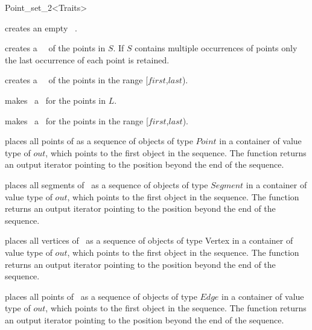 \begin{ccRefClass}{Point_set_2<Traits>}
\ccHtmlLinksOn


\ccCreation

{creates an empty \ccRefName\ .}

{creates a \ccRefName\ \ccVar\ of the points in $S$. 
If $S$ contains multiple occurrences of points only the last 
occurrence of each point is retained.}

{creates a \ccRefName\ \ccVar\ of the points in the range
[$first$,$last$).}


\ccOperations

{ makes \ccVar\ a \ccRefName\ for the points in $L$.}

{ makes \ccVar\ a \ccRefName\ for the points in the range
[$first$,$last$).}

{ places all points of \ccVar as a sequence of objects of type
$Point$ in a container of value type of  $out$,
which points to the first object in the sequence. The function
returns an output iterator pointing to the position beyond the end
of the sequence.} 

{ places all segments of \ccVar\ as a sequence of objects of type
$Segment$ in a container of value type of $out$,
which points to the first object in the sequence. The function
returns an output iterator pointing to the position beyond the end
of the sequence.} 

\ccHtmlLinksOff

{ places all vertices of \ccVar\ as a sequence of objects of type
Vertex in a container of value type of $out$,
which points to the first object in the sequence. The function
returns an output iterator pointing to the position beyond the end
of the sequence.} 

\ccHtmlLinksOn


{ places all points of \ccVar\ as a sequence of objects of type
$Edge$ in a container of value type of $out$,
which points to the first object in the sequence. The function
returns an output iterator pointing to the position beyond the end
of the sequence.} 


\end{ccRefClass}
